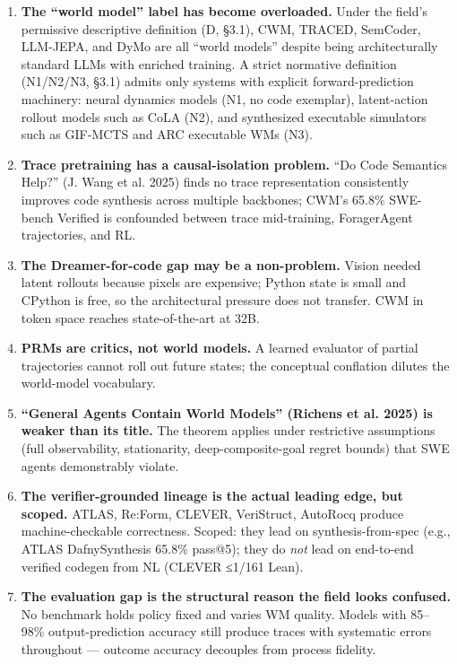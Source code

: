 \documentclass{article}
\begin{document}
\begin{enumerate}
\def\labelenumi{\arabic{enumi}.}
\item
  \textbf{The ``world model'' label has become overloaded.} Under the
  field's permissive descriptive definition (D, §3.1), CWM, TRACED,
  SemCoder, LLM-JEPA, and DyMo are all ``world models'' despite being
  architecturally standard LLMs with enriched training. A strict
  normative definition (N1/N2/N3, §3.1) admits only systems with
  explicit forward-prediction machinery: neural dynamics models (N1, no
  code exemplar), latent-action rollout models such as CoLA (N2), and
  synthesized executable simulators such as GIF-MCTS and ARC executable
  WMs (N3).
\item
  \textbf{Trace pretraining has a causal-isolation problem.} ``Do Code
  Semantics Help?'' (J. Wang et al. 2025) finds no trace representation
  consistently improves code synthesis across multiple backbones; CWM's
  65.8\% SWE-bench Verified is confounded between trace mid-training,
  ForagerAgent trajectories, and RL.
\item
  \textbf{The Dreamer-for-code gap may be a non-problem.} Vision needed
  latent rollouts because pixels are expensive; Python state is small
  and CPython is free, so the architectural pressure does not transfer.
  CWM in token space reaches state-of-the-art at 32B.
\item
  \textbf{PRMs are critics, not world models.} A learned evaluator of
  partial trajectories cannot roll out future states; the conceptual
  conflation dilutes the world-model vocabulary.
\item
  \textbf{``General Agents Contain World Models'' (Richens et al. 2025)
  is weaker than its title.} The theorem applies under restrictive
  assumptions (full observability, stationarity, deep-composite-goal
  regret bounds) that SWE agents demonstrably violate.
\item
  \textbf{The verifier-grounded lineage is the actual leading edge, but
  scoped.} ATLAS, Re:Form, CLEVER, VeriStruct, AutoRocq produce
  machine-checkable correctness. Scoped: they lead on
  synthesis-from-spec (e.g., ATLAS DafnySynthesis 65.8\% pass@5); they
  do \emph{not} lead on end-to-end verified codegen from NL (CLEVER
  ≤1/161 Lean).
\item
  \textbf{The evaluation gap is the structural reason the field looks
  confused.} No benchmark holds policy fixed and varies WM quality.
  Models with 85--98\% output-prediction accuracy still produce traces
  with systematic errors throughout --- outcome accuracy decouples from
  process fidelity.
\end{enumerate}
\end{document}
